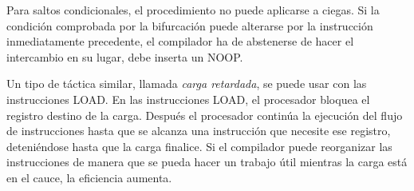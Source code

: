 Para saltos condicionales, el procedimiento no puede aplicarse a ciegas. Si la condición comprobada por la bifurcación puede alterarse por la instrucción inmediatamente precedente, el compilador ha de abstenerse de hacer el intercambio en su lugar, debe inserta un NOOP.

Un tipo de táctica similar, llamada \textit{carga retardada}, se puede usar con las instrucciones LOAD. En las instrucciones LOAD, el procesador bloquea el registro destino de la carga. Después el procesador continúa la ejecución del flujo de instrucciones hasta que se alcanza una instrucción que necesite ese registro, deteniéndose hasta que la carga finalice. Si el compilador puede reorganizar las instrucciones de manera que se pueda hacer un trabajo útil mientras la carga está en el cauce, la eficiencia aumenta.

